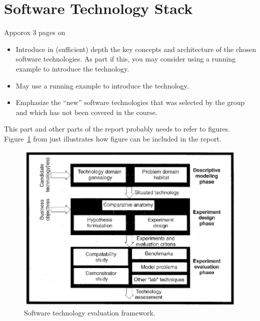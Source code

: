 \section{Software Technology Stack}
\label{sec:technology}

Apporox 3 pages on 

\begin{itemize} 

\item Introduce in (sufficient) depth the key concepts and architecture of the chosen software technologies. As part if this, you may consider using a running example to introduce the technology.
\item May use a running example to introduce the technology.
\item Emphasize the “new” software technologies that was selected by the group and which has not been covered in the course.

\end{itemize}

This part and other parts of the report probably needs to refer to
figures. Figure~\ref{fig:framework} from \cite{brown:96} just
illustrates how figure can be included in the report.

\begin{figure}
  \centering
  \includegraphics[scale=0.5]{figs/framework.png}
  \caption{Software technology evaluation framework.}
  \label{fig:framework}
\end{figure}

